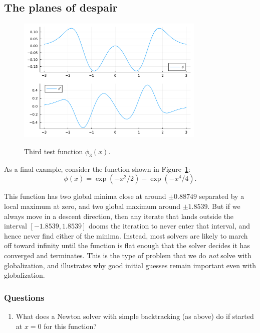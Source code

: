 \documentclass[12pt, leqno]{article} %
\providecommand{\tightlist}{%
  \setlength{\itemsep}{0pt}\setlength{\parskip}{0pt}}
\begin{document}
\subsection{The planes of despair}

\begin{figure}
\begin{center}
  \includegraphics[width=0.8\textwidth]{fig/2023-04-17-phi3.pdf} \\
\end{center}
\caption{Third test function $\phi_3(x)$.}
\label{fig:phi3}
\end{figure}

As a final example, consider the function shown in Figure~\ref{fig:phi3}:
\[
  \phi(x) = \exp(-x^2/2)-\exp(-x^4/4).
\]

This function has two global minima close at around \(\pm 0.88749\)
separated by a local maximum at zero, and two global maximum around
\(\pm 1.8539\). But if we always move in a descent direction, then any
iterate that lands outside the interval \([-1.8539, 1.8539]\) dooms the
iteration to never enter that interval, and hence never find either of
the minima. Instead, most solvers are likely to march off toward
infinity until the function is flat enough that the solver decides it
has converged and terminates. This is the type of problem that we do
\emph{not} solve with globalization, and illustrates why good initial
guesses remain important even with globalization.

\subsubsection{Questions}

\begin{enumerate}
\def\labelenumi{\arabic{enumi}.}
\tightlist
\item
  What does a Newton solver with simple backtracking (as above) do if
  started at \(x = 0\) for this function?
\end{enumerate}
\end{document}
